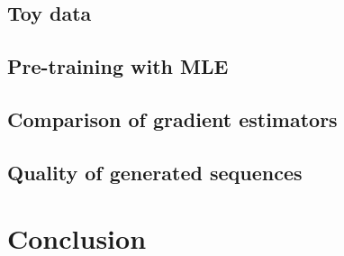 \documentclass[11pt, english]{article}
\begin{document}
  \subsection{Toy data}
  
  \subsection{Pre-training with MLE}
  
  \subsection{Comparison of gradient estimators}
  
  \subsection{Quality of generated sequences}
  
  
  \section{Conclusion}
  

  
  
  
  
\end{document}
